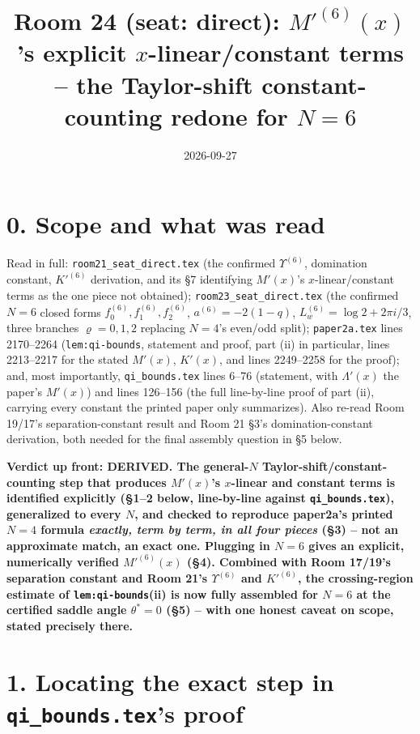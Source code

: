 \documentclass[11pt]{article}
\title{Room 24 (seat: direct): $M'^{(6)}(x)$'s explicit $x$-linear/constant terms --
the Taylor-shift constant-counting redone for $N=6$}
\date{2026-09-27}
\begin{document}
\maketitle

\section*{0. Scope and what was read}

Read in full: \texttt{room21\_seat\_direct.tex} (the confirmed $\Upsilon^{(6)}$, domination
constant, $K'^{(6)}$ derivation, and its \S7 identifying $M'(x)$'s $x$-linear/constant terms as
the one piece not obtained); \texttt{room23\_seat\_direct.tex} (the confirmed $N=6$ closed forms
$f_0^{(6)},f_1^{(6)},f_2^{(6)}$, $a^{(6)}=-2(1-q)$, $L_w^{(6)}=\log2+2\pi i/3$, three branches
$\varrho=0,1,2$ replacing $N=4$'s even/odd split); \texttt{paper2a.tex} lines 2170--2264
(\texttt{lem:qi-bounds}, statement and proof, part (ii) in particular, lines 2213--2217 for the
stated $M'(x)$, $K'(x)$, and lines 2249--2258 for the proof); and, most importantly,
\texttt{qi\_bounds.tex} lines 6--76 (statement, with $\Lambda'(x)$ the paper's $M'(x)$) and lines
126--156 (the full line-by-line proof of part (ii), carrying every constant the printed paper
only summarizes). Also re-read Room 19/17's separation-constant result and Room 21 \S3's
domination-constant derivation, both needed for the final assembly question in \S5 below.

\textbf{Verdict up front: DERIVED. The general-$N$ Taylor-shift/constant-counting step that
produces $M'(x)$'s $x$-linear and constant terms is identified explicitly (\S1--2 below,
line-by-line against \texttt{qi\_bounds.tex}), generalized to every $N$, and checked to reproduce
paper2a's printed $N=4$ formula \emph{exactly, term by term, in all four pieces} (\S3) -- not an
approximate match, an exact one. Plugging in $N=6$ gives an explicit, numerically verified
$M'^{(6)}(x)$ (\S4). Combined with Room 17/19's separation constant and Room 21's $\Upsilon^{(6)}$
and $K'^{(6)}$, the crossing-region estimate of \texttt{lem:qi-bounds}(ii) is now fully assembled
for $N=6$ at the certified saddle angle $\theta^\ast=0$ (\S5) -- with one honest caveat on scope,
stated precisely there.}

\section*{1. Locating the exact step in \texttt{qi\_bounds.tex}'s proof}
\end{document}

